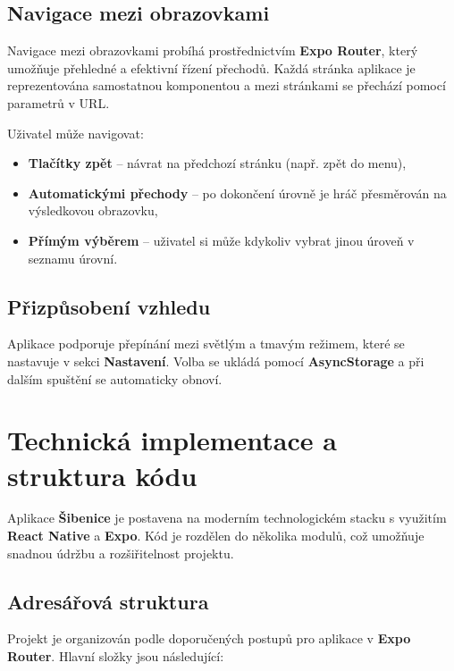 \documentclass[a4paper,12pt]{article}
\begin{document}
\subsection{Navigace mezi obrazovkami}

Navigace mezi obrazovkami probíhá prostřednictvím \textbf{Expo Router}, který umožňuje přehledné a efektivní řízení přechodů. Každá stránka aplikace je reprezentována samostatnou komponentou a mezi stránkami se přechází pomocí parametrů v URL.

Uživatel může navigovat:
\begin{itemize}
    \item \textbf{Tlačítky zpět} – návrat na předchozí stránku (např. zpět do menu),
    \item \textbf{Automatickými přechody} – po dokončení úrovně je hráč přesměrován na výsledkovou obrazovku,
    \item \textbf{Přímým výběrem} – uživatel si může kdykoliv vybrat jinou úroveň v seznamu úrovní.
\end{itemize}

\subsection{Přizpůsobení vzhledu}

Aplikace podporuje přepínání mezi světlým a tmavým režimem, které se nastavuje v sekci \textbf{Nastavení}. Volba se ukládá pomocí \textbf{AsyncStorage} a při dalším spuštění se automaticky obnoví.

\section{Technická implementace a struktura kódu}

Aplikace \textbf{Šibenice} je postavena na moderním technologickém stacku s využitím \textbf{React Native} a \textbf{Expo}. Kód je rozdělen do několika modulů, což umožňuje snadnou údržbu a rozšiřitelnost projektu.

\subsection{Adresářová struktura}

Projekt je organizován podle doporučených postupů pro aplikace v \textbf{Expo Router}. Hlavní složky jsou následující:
\end{document}

